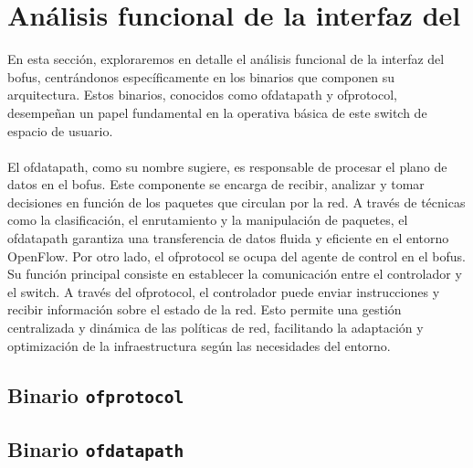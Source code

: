 \section{Análisis funcional de la interfaz del }
\label{sec:ana_bofuss}

En esta sección, exploraremos en detalle el análisis funcional de la interfaz del \gls{bofus}, centrándonos específicamente en los binarios que componen su arquitectura. Estos binarios, conocidos como ofdatapath y ofprotocol, desempeñan un papel fundamental en la operativa básica de este switch de espacio de usuario.\\
\\
El ofdatapath, como su nombre sugiere, es responsable de procesar el plano de datos en el \gls{bofus}. Este componente se encarga de recibir, analizar y tomar decisiones en función de los paquetes que circulan por la red. A través de técnicas como la clasificación, el enrutamiento y la manipulación de paquetes, el ofdatapath garantiza una transferencia de datos fluida y eficiente en el entorno OpenFlow. Por otro lado, el ofprotocol se ocupa del agente de control en el \gls{bofus}. Su función principal consiste en establecer la comunicación entre el controlador y el switch. A través del ofprotocol, el controlador puede enviar instrucciones y recibir información sobre el estado de la red. Esto permite una gestión centralizada y dinámica de las políticas de red, facilitando la adaptación y optimización de la infraestructura según las necesidades del entorno.\\


\subsection{Binario \texttt{ofprotocol}}

\subsection{Binario \texttt{ofdatapath}}